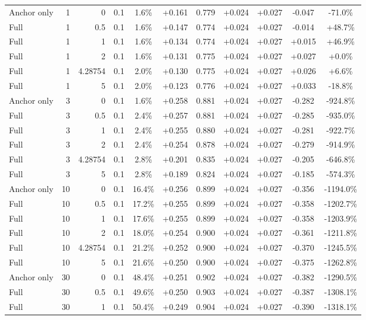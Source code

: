 \begin{table}[htbp]
\begin{tabular}{lrrrccccccc}
Anchor only & 1 & 0 & 0.1 & 1.6\% & +0.161 & 0.779 & +0.024 & +0.027 & -0.047 & -71.0\% \\
Full & 1 & 0.5 & 0.1 & 1.6\% & +0.147 & 0.774 & +0.024 & +0.027 & -0.014 & +48.7\% \\
Full & 1 & 1 & 0.1 & 1.6\% & +0.134 & 0.774 & +0.024 & +0.027 & +0.015 & +46.9\% \\
Full & 1 & 2 & 0.1 & 1.6\% & +0.131 & 0.775 & +0.024 & +0.027 & +0.027 & +0.0\% \\
Full & 1 & 4.28754 & 0.1 & 2.0\% & +0.130 & 0.775 & +0.024 & +0.027 & +0.026 & +6.6\% \\
Full & 1 & 5 & 0.1 & 2.0\% & +0.123 & 0.776 & +0.024 & +0.027 & +0.033 & -18.8\% \\
Anchor only & 3 & 0 & 0.1 & 1.6\% & +0.258 & 0.881 & +0.024 & +0.027 & -0.282 & -924.8\% \\
Full & 3 & 0.5 & 0.1 & 2.4\% & +0.257 & 0.881 & +0.024 & +0.027 & -0.285 & -935.0\% \\
Full & 3 & 1 & 0.1 & 2.4\% & +0.255 & 0.880 & +0.024 & +0.027 & -0.281 & -922.7\% \\
Full & 3 & 2 & 0.1 & 2.4\% & +0.254 & 0.878 & +0.024 & +0.027 & -0.279 & -914.9\% \\
Full & 3 & 4.28754 & 0.1 & 2.8\% & +0.201 & 0.835 & +0.024 & +0.027 & -0.205 & -646.8\% \\
Full & 3 & 5 & 0.1 & 2.8\% & +0.189 & 0.824 & +0.024 & +0.027 & -0.185 & -574.3\% \\
Anchor only & 10 & 0 & 0.1 & 16.4\% & +0.256 & 0.899 & +0.024 & +0.027 & -0.356 & -1194.0\% \\
Full & 10 & 0.5 & 0.1 & 17.2\% & +0.255 & 0.899 & +0.024 & +0.027 & -0.358 & -1202.7\% \\
Full & 10 & 1 & 0.1 & 17.6\% & +0.255 & 0.899 & +0.024 & +0.027 & -0.358 & -1203.9\% \\
Full & 10 & 2 & 0.1 & 18.0\% & +0.254 & 0.900 & +0.024 & +0.027 & -0.361 & -1211.8\% \\
Full & 10 & 4.28754 & 0.1 & 21.2\% & +0.252 & 0.900 & +0.024 & +0.027 & -0.370 & -1245.5\% \\
Full & 10 & 5 & 0.1 & 21.6\% & +0.250 & 0.900 & +0.024 & +0.027 & -0.375 & -1262.8\% \\
Anchor only & 30 & 0 & 0.1 & 48.4\% & +0.251 & 0.902 & +0.024 & +0.027 & -0.382 & -1290.5\% \\
Full & 30 & 0.5 & 0.1 & 49.6\% & +0.250 & 0.903 & +0.024 & +0.027 & -0.387 & -1308.1\% \\
Full & 30 & 1 & 0.1 & 50.4\% & +0.249 & 0.904 & +0.024 & +0.027 & -0.390 & -1318.1\% \\

\end{tabular}
\end{table}
